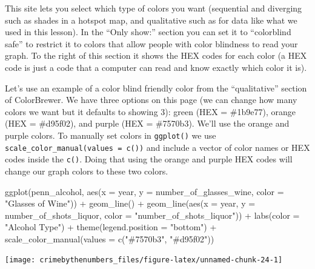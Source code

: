 \documentclass[
  12pt,
]{book}
\newenvironment{Shaded}{\begin{snugshade}}{\end{snugshade}}
\newcommand{\AttributeTok}[1]{\textcolor[rgb]{0.61,0.61,0.61}{#1}}
\newcommand{\FunctionTok}[1]{\textcolor[rgb]{0,0,0}{#1}}
\newcommand{\NormalTok}[1]{#1}
\newcommand{\SpecialCharTok}[1]{\textcolor[rgb]{0,0,0}{#1}}
\newcommand{\StringTok}[1]{\textcolor[rgb]{0.5,0.5,0.5}{#1}}
\begin{document}
This site lets you select which type of colors you want (sequential and diverging such as shades in a hotspot map, and qualitative such as for data like what we used in this lesson). In the ``Only show:'' section you can set it to ``colorblind safe'' to restrict it to colors that allow people with color blindness to read your graph. To the right of this section it shows the HEX codes for each color (a HEX code is just a code that a computer can read and know exactly which color it is).

Let's use an example of a color blind friendly color from the ``qualitative'' section of ColorBrewer. We have three options on this page (we can change how many colors we want but it defaults to showing 3): green (HEX = \#1b9e77), orange (HEX = \#d95f02), and purple (HEX = \#7570b3). We'll use the orange and purple colors. To manually set colors in \texttt{ggplot()} we use \texttt{scale\_color\_manual(values\ =\ c())} and include a vector of color names or HEX codes inside the \texttt{c()}. Doing that using the orange and purple HEX codes will change our graph colors to these two colors.

\begin{Shaded}
\begin{Highlighting}[]
\FunctionTok{ggplot}\NormalTok{(penn\_alcohol, }\FunctionTok{aes}\NormalTok{(}\AttributeTok{x =}\NormalTok{ year, }\AttributeTok{y =}\NormalTok{ number\_of\_glasses\_wine,}
                         \AttributeTok{color =} \StringTok{"Glasses of Wine"}\NormalTok{)) }\SpecialCharTok{+}
  \FunctionTok{geom\_line}\NormalTok{() }\SpecialCharTok{+}
  \FunctionTok{geom\_line}\NormalTok{(}\FunctionTok{aes}\NormalTok{(}\AttributeTok{x =}\NormalTok{ year, }\AttributeTok{y =}\NormalTok{ number\_of\_shots\_liquor,}
                \AttributeTok{color =} \StringTok{"number\_of\_shots\_liquor"}\NormalTok{)) }\SpecialCharTok{+}
  \FunctionTok{labs}\NormalTok{(}\AttributeTok{color =} \StringTok{"Alcohol Type"}\NormalTok{) }\SpecialCharTok{+}
  \FunctionTok{theme}\NormalTok{(}\AttributeTok{legend.position =} \StringTok{"bottom"}\NormalTok{) }\SpecialCharTok{+}
  \FunctionTok{scale\_color\_manual}\NormalTok{(}\AttributeTok{values =} \FunctionTok{c}\NormalTok{(}\StringTok{"\#7570b3"}\NormalTok{, }\StringTok{"\#d95f02"}\NormalTok{))}
\end{Highlighting}
\end{Shaded}

\begin{center}\texttt{[image: crimebythenumbers\_files/figure-latex/unnamed-chunk-24-1]} \end{center}
\end{document}
